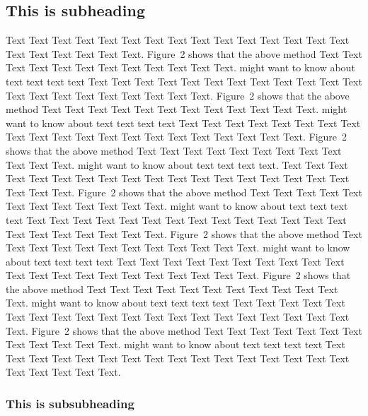 \documentclass{bioinfo}
\begin{document}
\begin{methods}
\subsection{This is subheading}

Text Text Text Text Text Text  Text Text Text Text Text Text Text
Text Text  Text Text Text Text Text Text.
Figure~2\vphantom{\ref{fig:02}} shows that the above method  Text
Text Text Text  Text Text Text Text Text Text  Text Text.
\citealp{Boffelli03} might want to know about  text text text text
Text Text Text Text Text Text  Text Text Text Text Text Text Text
Text Text  Text Text Text Text Text Text.
Figure~2\vphantom{\ref{fig:02}} shows that the above method  Text
Text Text Text Text Text Text Text Text Text  Text Text.
\citealp{Boffelli03} might want to know about  text text text text
Text Text Text Text Text Text Text Text Text Text Text Text Text
Text Text  Text Text Text Text Text Text.
Figure~2\vphantom{\ref{fig:02}} shows that the above method  Text
Text Text Text Text Text Text Text Text Text  Text Text.
\citealp{Boffelli03} might want to know about  text text text
text. Text Text Text Text Text Text  Text Text Text Text Text Text
Text Text Text  Text Text Text Text Text Text.
Figure~2\vphantom{\ref{fig:02}} shows that the above method  Text
Text Text Text Text Text Text Text Text Text  Text Text.
\citealp{Boffelli03} might want to know about  text text text text
Text Text Text Text Text Text Text Text Text Text Text Text Text
Text Text  Text Text Text Text Text Text.
Figure~2\vphantom{\ref{fig:02}} shows that the above method  Text
Text Text Text Text Text Text Text Text Text  Text Text.
\citealp{Boffelli03} might want to know about  text text text text
Text Text Text Text Text Text  Text Text Text Text Text Text Text
Text Text  Text Text Text Text Text Text.
Figure~2\vphantom{\ref{fig:02}} shows that the above method  Text
Text Text Text Text Text Text Text Text Text  Text Text.
\citealp{Boffelli03} might want to know about  text text text text
Text Text Text Text Text Text Text Text Text Text Text Text Text
Text Text  Text Text Text Text Text Text.
Figure~2\vphantom{\ref{fig:02}} shows that the above method  Text
Text Text Text Text Text Text Text Text Text  Text Text.
\citealp{Boffelli03} might want to know about  text text text text
Text Text Text Text Text Text  Text Text Text Text Text Text Text
Text Text  Text Text Text Text Text Text.


\subsubsection{This is subsubheading}


\end{methods}
\end{document}
